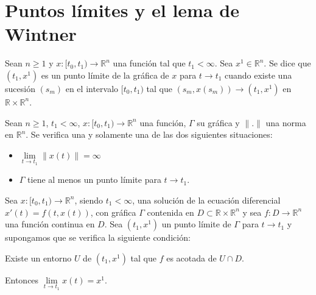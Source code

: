 \section{Puntos límites y el lema de Wintner}
\begin{definition}
    Sean $n \geq 1$ y $x: [t_0, t_1) \to \mathbb{R}^n$ una función tal que $t_1 < \infty$.
    Sea $x^1 \in \mathbb{R}^n$.
    Se dice que $(t_1, x^1)$ es un punto límite de la gráfica de $x$ para $t \to t_1$ cuando existe una sucesión $(s_m)$ en el intervalo $[t_0, t_1)$ tal que $(s_m, x(s_m)) \to (t_1, x^1)$ en $\mathbb{R} \times \mathbb{R}^n$.
\end{definition}

\begin{proposition}
    Sean $n \geq 1$, $t_1 < \infty$, $x: [t_0, t_1) \to \mathbb{R}^n$ una función, $\Gamma$ su gráfica y $\|.\|$ una norma en $\mathbb{R}^n$.
    Se verifica una y solamente una de las dos siguientes situaciones:
    \begin{itemize}
        \item $\lim\limits_{t \to t_1} \|x(t)\| = \infty$
        \item $\Gamma$ tiene al menos un punto límite para $t \to t_1$.
    \end{itemize}
\end{proposition}

\begin{theorem}
    Sea $x: [t_0, t_1) \to \mathbb{R}^n$, siendo $t_1 < \infty$, una solución de la ecuación diferencial $x'(t) = f(t, x(t))$, con gráfica $\Gamma$ contenida en $D \subset \mathbb{R} \times \mathbb{R}^n$ y sea $f: D \to \mathbb{R}^n$ una función continua en $D$.
    Sea $(t_1, x^1)$ un punto límite de $\Gamma$ para $t \to t_1$ y supongamos que se verifica la siguiente condición:
    \begin{center}
        Existe un entorno $U$ de $(t_1, x^1)$ tal que $f$ es acotada de $U \cap D$.
    \end{center}

    Entonces $\lim\limits_{t \to t_1} x(t) = x^1$.
\end{theorem}

